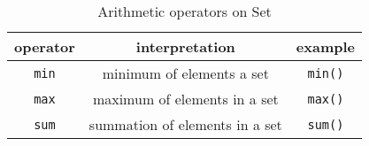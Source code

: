\begin{table}[H]
\centering
\caption{Arithmetic operators on Set}
\begin{tabular}{ c c c }
\toprule 
operator & interpretation & example \\
\midrule
\verb|min| & minimum of elements a set & \verb|min()|\\ 
\verb|max| & maximum of elements in a set & \verb|max()|\\
\verb|sum| & summation of elements in a set & \verb|sum()|\\ 
\bottomrule
\end{tabular}
\end{table}

